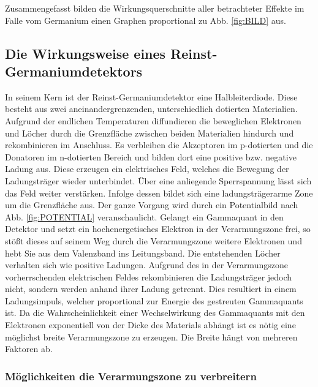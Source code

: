 Zusammengefasst bilden die Wirkungsquerschnitte aller betrachteter Effekte im Falle vom Germanium einen Graphen proportional zu Abb. \ref{fig:BILD} aus. %



\subsection{Die Wirkungsweise eines Reinst-Germaniumdetektors}
In seinem Kern ist der Reinst-Germaniumdetektor eine Halbleiterdiode. Diese besteht aus zwei aneinandergrenzenden, unterschiedlich dotierten Materialien. Aufgrund der endlichen Temperaturen diffundieren die beweglichen Elektronen und Löcher durch die Grenzfläche zwischen beiden Materialien hindurch und rekombinieren im Anschluss. Es verbleiben die Akzeptoren im p-dotierten und die Donatoren im n-dotierten Bereich und bilden dort eine positive bzw. negative Ladung aus. Diese erzeugen ein elektrisches Feld, welches die Bewegung der Ladungsträger wieder unterbindet. Über eine anliegende Sperrspannung lässt sich das Feld weiter verstärken. Infolge dessen bildet sich eine ladungsträgerarme Zone um die Grenzfläche aus. Der ganze Vorgang wird durch ein Potentialbild nach Abb. \ref{fig:POTENTIAL} veranschaulicht. Gelangt ein Gammaquant in den Detektor und setzt ein hochenergetisches Elektron in der Verarmungszone frei, so stößt dieses auf seinem Weg durch die Verarmungszone weitere Elektronen und hebt Sie aus dem Valenzband ins Leitungsband. Die entstehenden Löcher verhalten sich wie positive Ladungen. Aufgrund des in der Verarmungszone vorherrschenden elektrischen Feldes rekombinieren die Ladungsträger jedoch nicht, sondern werden anhand ihrer Ladung getrennt. Dies resultiert in einem Ladungsimpuls, welcher proportional zur Energie des gestreuten Gammaquants ist. %
Da die Wahrscheinlichkeit einer Wechselwirkung des Gammaquants mit den Elektronen exponentiell von der Dicke des Materials abhängt ist es nötig eine möglichst breite Verarmungszone zu erzeugen. Die Breite hängt von mehreren Faktoren ab.

\subsubsection{Möglichkeiten die Verarmungszone zu verbreitern}

